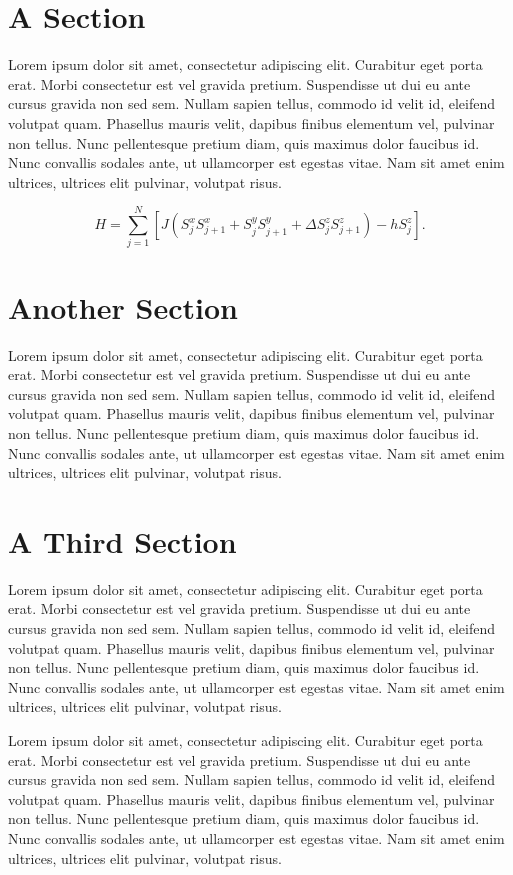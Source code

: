 \documentclass[10pt]{article}
\begin{document}
\section{A Section}
Lorem ipsum dolor sit amet, consectetur adipiscing elit. Curabitur eget porta erat. Morbi consectetur est vel gravida pretium. Suspendisse ut dui eu ante cursus gravida non sed sem. Nullam sapien tellus, commodo id velit id, eleifend volutpat quam. Phasellus mauris velit, dapibus finibus elementum vel, pulvinar non tellus. Nunc pellentesque pretium diam, quis maximus dolor faucibus id. Nunc convallis sodales ante, ut ullamcorper est egestas vitae. Nam sit amet enim ultrices, ultrices elit pulvinar, volutpat risus.

\begin{equation}
H = \sum_{j=1}^N \left[J (S^x_j S^x_{j+1} + S^y_j S^y_{j+1} + \Delta S^z_j S^z_{j+1}) - h S^z_j \right].
\end{equation}


\section{Another Section}
Lorem ipsum dolor sit amet, consectetur adipiscing elit. Curabitur eget porta erat. Morbi consectetur est vel gravida pretium. Suspendisse ut dui eu ante cursus gravida non sed sem. Nullam sapien tellus, commodo id velit id, eleifend volutpat quam. Phasellus mauris velit, dapibus finibus elementum vel, pulvinar non tellus. Nunc pellentesque pretium diam, quis maximus dolor faucibus id. Nunc convallis sodales ante, ut ullamcorper est egestas vitae. Nam sit amet enim ultrices, ultrices elit pulvinar, volutpat risus.

\section{A Third Section}
Lorem ipsum dolor sit amet, consectetur adipiscing elit. Curabitur eget porta erat. Morbi consectetur est vel gravida pretium. Suspendisse ut dui eu ante cursus gravida non sed sem. Nullam sapien tellus, commodo id velit id, eleifend volutpat quam. Phasellus mauris velit, dapibus finibus elementum vel, pulvinar non tellus. Nunc pellentesque pretium diam, quis maximus dolor faucibus id. Nunc convallis sodales ante, ut ullamcorper est egestas vitae. Nam sit amet enim ultrices, ultrices elit pulvinar, volutpat risus.

Lorem ipsum dolor sit amet, consectetur adipiscing elit. Curabitur eget porta erat. Morbi consectetur est vel gravida pretium. Suspendisse ut dui eu ante cursus gravida non sed sem. Nullam sapien tellus, commodo id velit id, eleifend volutpat quam. Phasellus mauris velit, dapibus finibus elementum vel, pulvinar non tellus. Nunc pellentesque pretium diam, quis maximus dolor faucibus id. Nunc convallis sodales ante, ut ullamcorper est egestas vitae. Nam sit amet enim ultrices, ultrices elit pulvinar, volutpat risus.
\end{document}
